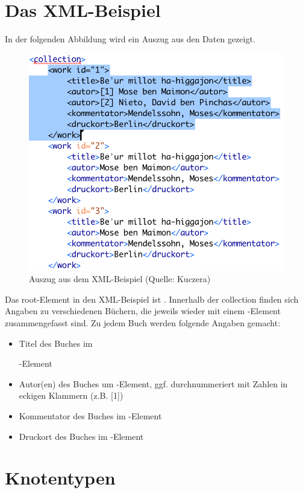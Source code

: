 \documentclass[ngerman,]{scrreprt}
\providecommand{\tightlist}{%
  \setlength{\itemsep}{0pt}\setlength{\parskip}{0pt}}
\begin{document}
\section{Das XML-Beispiel}\label{das-xml-beispiel}

In der folgenden Abbildung wird ein Auszug aus den Daten gezeigt.

\begin{figure}
\centering
\includegraphics{./Bilder/kollatz-xml-Beispiel.png}
\caption{Auszug aus dem XML-Beispiel (Quelle: Kuczera)}
\end{figure}

Das root-Element in den XML-Beispiel ist . Innerhalb der collection finden sich Angaben zu verschiedenen Büchern, die jeweils wieder mit einem -Element zusammengefasst sind. Zu jedem Buch werden folgende Angaben gemacht:

\begin{itemize}
\tightlist
\item
  Titel des Buches im

  -Element
\item
  Autor(en) des Buches um -Element, ggf. durchnummeriert mit Zahlen in eckigen Klammern (z.B. {[}1{]})
\item
  Kommentator des Buches im -Element
\item
  Druckort des Buches im -Element
\end{itemize}

\section{Knotentypen}\label{knotentypen}
\end{document}
